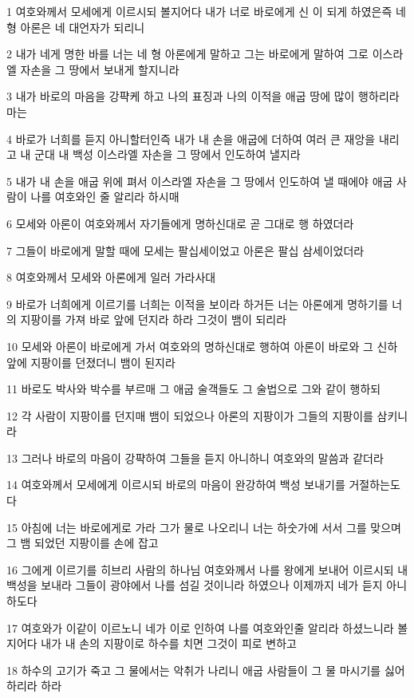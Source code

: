 \par 1 여호와께서 모세에게 이르시되 볼지어다 내가 너로 바로에게 신 이 되게 하였은즉 네 형 아론은 네 대언자가 되리니
\par 2 내가 네게 명한 바를 너는 네 형 아론에게 말하고 그는 바로에게 말하여 그로 이스라엘 자손을 그 땅에서 보내게 할지니라
\par 3 내가 바로의 마음을 강퍅케 하고 나의 표징과 나의 이적을 애굽 땅에 많이 행하리라마는
\par 4 바로가 너희를 듣지 아니할터인즉 내가 내 손을 애굽에 더하여 여러 큰 재앙을 내리고 내 군대 내 백성 이스라엘 자손을 그 땅에서 인도하여 낼지라
\par 5 내가 내 손을 애굽 위에 펴서 이스라엘 자손을 그 땅에서 인도하여 낼 때에야 애굽 사람이 나를 여호와인 줄 알리라 하시매
\par 6 모세와 아론이 여호와께서 자기들에게 명하신대로 곧 그대로 행 하였더라
\par 7 그들이 바로에게 말할 때에 모세는 팔십세이었고 아론은 팔십 삼세이었더라
\par 8 여호와께서 모세와 아론에게 일러 가라사대
\par 9 바로가 너희에게 이르기를 너희는 이적을 보이라 하거든 너는 아론에게 명하기를 너의 지팡이를 가져 바로 앞에 던지라 하라 그것이 뱀이 되리라
\par 10 모세와 아론이 바로에게 가서 여호와의 명하신대로 행하여 아론이 바로와 그 신하 앞에 지팡이를 던졌더니 뱀이 된지라
\par 11 바로도 박사와 박수를 부르매 그 애굽 술객들도 그 술법으로 그와 같이 행하되
\par 12 각 사람이 지팡이를 던지매 뱀이 되었으나 아론의 지팡이가 그들의 지팡이를 삼키니라
\par 13 그러나 바로의 마음이 강퍅하여 그들을 듣지 아니하니 여호와의 말씀과 같더라
\par 14 여호와께서 모세에게 이르시되 바로의 마음이 완강하여 백성 보내기를 거절하는도다
\par 15 아침에 너는 바로에게로 가라 그가 물로 나오리니 너는 하숫가에 서서 그를 맞으며 그 뱀 되었던 지팡이를 손에 잡고
\par 16 그에게 이르기를 히브리 사람의 하나님 여호와께서 나를 왕에게 보내어 이르시되 내 백성을 보내라 그들이 광야에서 나를 섬길 것이니라 하였으나 이제까지 네가 듣지 아니하도다
\par 17 여호와가 이같이 이르노니 네가 이로 인하여 나를 여호와인줄 알리라 하셨느니라 볼지어다 내가 내 손의 지팡이로 하수를 치면 그것이 피로 변하고
\par 18 하수의 고기가 죽고 그 물에서는 악취가 나리니 애굽 사람들이 그 물 마시기를 싫어하리라 하라
